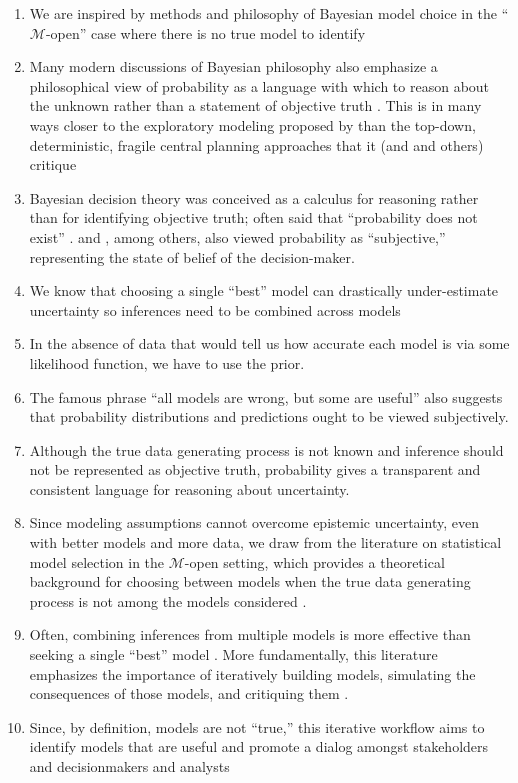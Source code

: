 \documentclass[11pt]{article}
\makeatletter
\newcommand{\james}[1]{\todo[color=giallo, textcolor=nero]{\textbf{ATTN James:~}#1}} %
\DeclareRobustCommand\onedot{\futurelet\@let@token\@onedot}
\def\@onedot{\ifx\@let@token.\else.\null\fi\xspace}
\def\eg{\emph{e.g}\onedot} \def\Eg{\emph{E.g}\onedot}
\DeclareRobustCommand\onedot{\futurelet\@let@token\@onedot}
\def\@onedot{\ifx\@let@token.\else.\null\fi\xspace}
\def\eg{\emph{e.g}\onedot} \def\Eg{\emph{E.g}\onedot}
\makeatother
\begin{document}
\begin{enumerate}
    \item We are inspired by methods and philosophy of Bayesian model choice in the ``$\mathcal{M}$-open'' case where there is no true model to identify
    \item Many modern discussions of Bayesian philosophy \citep{jaynes_probability:2003,McElreath:2016vu,Gelman:2014tc,bernardo_bayesian:1994} also emphasize a philosophical view of probability as a language with which to reason about the unknown rather than a statement of objective truth \citep[see][for a thorough discussion of Bayesian philosophy]{gelman_philosophy:2013}. This is in many ways closer to the exploratory modeling proposed by \citet{bankes:1993} than the top-down, deterministic, fragile central planning approaches that it (and \cite{rittel:1973} and others) critique
    \item Bayesian decision theory was conceived as a calculus for reasoning rather than for identifying objective truth; \citeauthor{definetti_probability:1972} often said that ``probability does not exist'' \citep{definetti_probability:1972}. \citet{savage:1954} and \citet{ramsey_probability:2016}, among others, also viewed probability as ``subjective,'' representing the state of belief of the decision-maker.
    \item We know that choosing a single ``best'' model can drastically under-estimate uncertainty so inferences need to be combined across models \citep[\eg, as in stacking;][]{Yao:2018bu}
    \item In the absence of data that would tell us how accurate each model is via some likelihood function, we have to use the prior.
    \item The famous phrase ``all models are wrong, but some are useful'' \citep[generally attributed to][]{box:1976} also suggests that probability distributions and predictions ought to be viewed subjectively.\james{Wording}
    \item Although the true data generating process is not known and inference should not be represented as objective truth, probability gives a transparent and consistent language for reasoning about uncertainty.
    \item Since modeling assumptions cannot overcome epistemic uncertainty, even with better models and more data, we draw from the literature on statistical model selection in the $\mathcal{M}$-open setting, which provides a theoretical background for choosing between models when the true data generating process is not among the models considered \citep[see][]{Piironen:2017eh}.
    \item Often, combining inferences from multiple models is more effective than seeking a single ``best'' model \citep{Yao:2018bu}. More fundamentally, this literature emphasizes the importance of iteratively building models, simulating the consequences of those models, and critiquing them \citep{gelman_workflow:2020}.
    \item Since, by definition, models are not ``true,'' this iterative workflow \citep{gelman_workflow:2020} aims to identify models that are useful and promote a dialog amongst stakeholders and decisionmakers and analysts \citep{gelman_philosophy:2013}
\end{enumerate}
\end{document}
